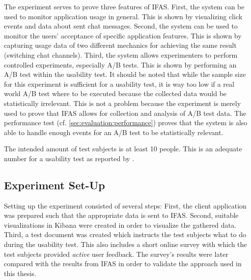 The experiment serves to prove three features of \ac{IFAS}.
First, the system can be used to monitor application usage in general.
This is shown by visualizing click events and data about sent chat messages.
Second, the system can be used to monitor the users' acceptance of specific application features.
This is shown by capturing usage data of two different mechanics for achieving the same result (switching chat channels).
Third, the system allows experimenters to perform controlled experiments, especially A/B tests.
This is shown by performing an A/B test within the usability test.
It should be noted that while the sample size for this experiment is sufficient for a usability test, it is way too low if a real world A/B test where to be executed because the collected data would be statistically irrelevant.
This is not a problem because the experiment is merely used to prove that \ac{IFAS} allows for collection and analysis of A/B test data.
The performance test (cf. \cref{sec:evaluation:performance}) proves that the system is also able to handle enough events for an A/B test to be statistically relevant.

The intended amount of test subjects is at least 10 people.
This is an adequate number for a usability test as reported by \citet{Turner2006}.

%

\subsection{Experiment Set-Up}

Setting up the experiment consisted of several steps:
First, the client application was prepared such that the appropriate data is sent to \ac{IFAS}.
Second, suitable visualizations in Kibana were created in order to visualize the gathered data.
Third, a test document was created which instructs the test subjects what to do during the usability test.
This also includes a short online survey with which the test subjects provided \emph{active} user feedback.
The survey's results were later compared with the results from \ac{IFAS} in order to validate the approach used in this thesis.

